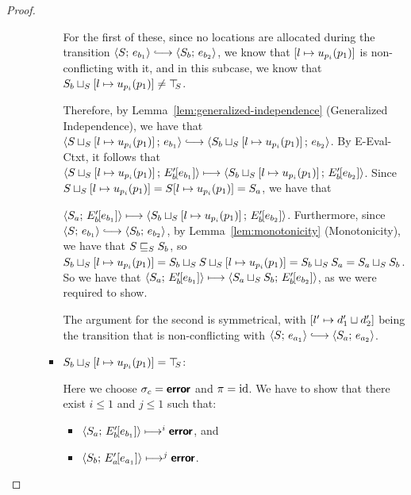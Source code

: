 \begin{proof}
\begin{enumerate}
\begin{enumerate}
\begin{itemize}
        For the first of these, since no locations are allocated
        during the transition $\config{S}{e_{b_1}} \parstepsto
        \config{S_b}{e_{b_2}}$, we know that
        $\left[ l \mapsto u_{p_i}(p_1) \right]$ is
        non-conflicting with it, and in this subcase, we know that
        $S_b \sqcup_{S} \left[ l \mapsto u_{p_i}(p_1) \right]
        \neq \top\hspace{-0.85mm}_{S}$.


        Therefore, by Lemma~\ref{lem:generalized-independence}
        (Generalized Independence), we have that
        $\config{\lubstore{S}{\store{\storebindingRaw{l}{u_{p_i}(p_1)}}}}{e_{b_1}}
        \parstepsto
        \config{\lubstore{S_b}{\store{\storebindingRaw{l}{u_{p_i}(p_1)}}}}{e_{b_2}}$.
        By {\sc E-Eval-Ctxt}, it follows that
        $\langle S \sqcup_{S} \left[ l \mapsto u_{p_i}(p_1) \right];\, E'_b\hspace{-1mm}\left[e_{b_1}\right] \rangle
        \longmapsto
        \langle S_b \sqcup_{S} \left[ l \mapsto u_{p_i}(p_1) \right];\, E'_b\hspace{-1mm}\left[e_{b_2}\right] \rangle$.
        Since $S \sqcup_{S} \left[ l \mapsto u_{p_i}(p_1) \right]
        = S[l \mapsto u_{p_i}(p_1)] = S_a$, we have that

        $\langle S_a;\, E'_b\hspace{-1mm}\left[e_{b_1}\right] \rangle \longmapsto
        \langle S_b \sqcup_{S} \left[ l \mapsto u_{p_i}(p_1) \right];\, E'_b\hspace{-1mm}\left[e_{b_2}\right] \rangle$.
        Furthermore, since $\config{S}{e_{b_1}} \parstepsto
        \config{S_b}{e_{b_2}}$, by Lemma~\ref{lem:monotonicity}
        (Monotonicity), we have that $S \sqsubseteq_S S_b$, so
        $S_b \sqcup_{S} \left[ l \mapsto u_{p_i}(p_1) \right]
        =
        S_b \sqcup_{S} S \sqcup_{S} \left[ l \mapsto u_{p_i}(p_1) \right]
        = S_b \sqcup_{S} S_a = S_a \sqcup_{S} S_b$.  So we have that
        $\langle S_a;\, E'_b\hspace{-1mm}\left[e_{b_1}\right] \rangle \longmapsto
        \langle S_a \sqcup_{S} S_b;\, E'_b\hspace{-1mm}\left[e_{b_2}\right] \rangle$, as we
        were required to show.

        The argument for the second is symmetrical, with
        $\left[ l' \mapsto d'_1 \sqcup d'_2 \right]$ being the
        transition that is non-conflicting with $\config{S}{e_{a_1}}
        \parstepsto \config{S_a}{e_{a_2}}$.

      \item
        $S_b \sqcup_{S} \left[ l \mapsto u_{p_i}(p_1) \right]
        = \top\hspace{-0.85mm}_{S}$:

        Here we choose $\sigma_c = \textbf{\textsf{error}}$ and $\pi = \mathrm{id}$.  We have to
        show that there exist $i \leq 1$ and $j \leq 1$ such that:
        \begin{itemize}
        \item $\langle S_a;\, E'_b\hspace{-1mm}\left[e_{b_1}\right] \rangle \longmapsto^i
          \textbf{\textsf{error}}$, and
        \item
          $\langle S_b;\, E'_a\hspace{-1mm}\left[e_{a_1}\right] \rangle \longmapsto^j \textbf{\textsf{error}}$.
        \end{itemize}


\end{itemize}
\end{enumerate}
\end{enumerate}
\end{proof}
